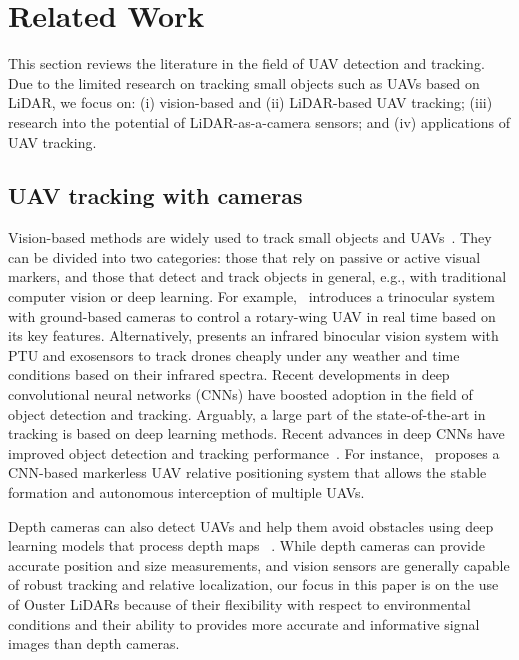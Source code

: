 

\section{Related Work} \label{sec:related_work}

This section reviews the literature in the field of UAV detection and tracking. Due to the limited research on tracking small objects such as UAVs based on LiDAR, we focus on: (i) vision-based and (ii) LiDAR-based UAV tracking; (iii) research into the potential of LiDAR-as-a-camera sensors; and (iv) applications of UAV tracking.

\subsection{UAV tracking with cameras}

Vision-based methods are widely used to track small objects and UAVs~\cite{mueller2016benchmark, 5354489, 8988144}. They can be divided into two categories: those that rely on passive or active visual markers, and those that detect and track objects in general, e.g., with traditional computer vision or deep learning.
For example, \cite{5354489}~introduces a trinocular system with ground-based cameras to control a rotary-wing UAV in real time based on its key features. Alternatively, \cite{6696776} presents an infrared binocular vision system with PTU and exosensors to track drones cheaply under any weather and time conditions based on their infrared spectra. Recent developments in deep convolutional neural networks (CNNs) have boosted adoption in the field of object detection and tracking. Arguably, a large part of the state-of-the-art in tracking is based on deep learning methods. Recent advances in deep CNNs have improved object detection and tracking performance~\cite{li2018deep}. For instance, \cite{8988144}~proposes a CNN-based markerless UAV relative positioning system that allows the stable formation and autonomous interception of multiple UAVs.

Depth cameras can also detect UAVs and help them avoid obstacles using deep learning models that process depth maps ~\cite{carrio2018drone}. While depth cameras can provide accurate position and size measurements, and vision sensors are generally capable of robust tracking and relative localization, our focus in this paper is on the use of Ouster LiDARs because of their flexibility with respect to environmental conditions and their ability to provides more accurate and informative signal images than depth cameras.


